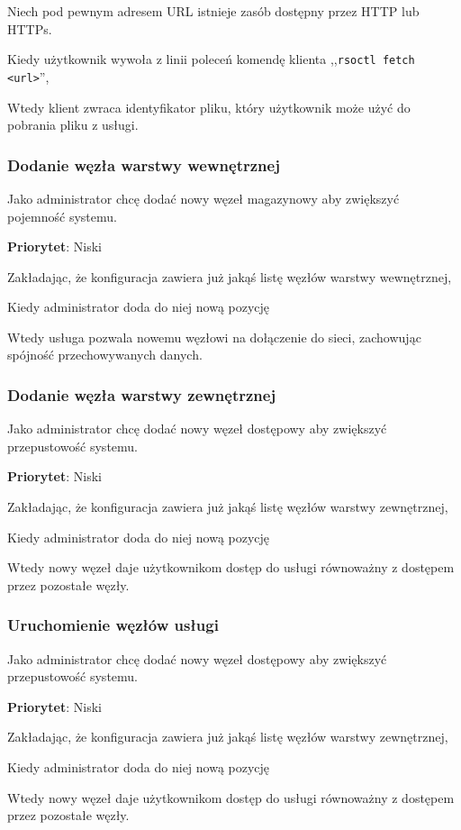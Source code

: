 \documentclass[a4paper,11pt]{article}
\begin{document}
Niech pod pewnym adresem URL istnieje zasób dostępny przez HTTP lub
HTTPs.

Kiedy użytkownik wywoła z linii poleceń komendę klienta ,,\texttt{rsoctl
fetch <url>}'',

Wtedy klient zwraca identyfikator pliku, który użytkownik może użyć do
pobrania pliku z usługi.

\subsubsection{Dodanie węzła warstwy wewnętrznej}
Jako administrator chcę dodać nowy węzeł magazynowy aby zwiększyć
pojemność systemu.

\textbf{Priorytet}: Niski

Zakładając, że konfiguracja zawiera już jakąś listę węzłów warstwy
wewnętrznej,

Kiedy administrator doda do niej nową pozycję

Wtedy usługa pozwala nowemu węzłowi na dołączenie do sieci, zachowując
spójność przechowywanych danych.

\subsubsection{Dodanie węzła warstwy zewnętrznej}
Jako administrator chcę dodać nowy węzeł dostępowy aby zwiększyć przepustowość systemu.

\textbf{Priorytet}: Niski

Zakładając, że konfiguracja zawiera już jakąś listę węzłów warstwy zewnętrznej,

Kiedy administrator doda do niej nową pozycję

Wtedy nowy węzeł daje użytkownikom dostęp do usługi równoważny z dostępem przez pozostałe węzły.

\subsubsection{Uruchomienie węzłów usługi}
Jako administrator chcę dodać nowy węzeł dostępowy aby zwiększyć przepustowość systemu.

\textbf{Priorytet}: Niski

Zakładając, że konfiguracja zawiera już jakąś listę węzłów warstwy zewnętrznej,

Kiedy administrator doda do niej nową pozycję

Wtedy nowy węzeł daje użytkownikom dostęp do usługi równoważny z dostępem przez pozostałe węzły.
\end{document}
